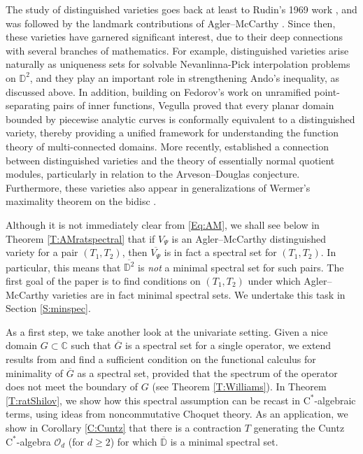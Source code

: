 \documentclass[10pt]{amsart}
\newcommand{\bC}{{\mathbb{C}}}
\newcommand{\bD}{{\mathbb{D}}}
\renewcommand{\O}{{\mathcal{O}}}
\newcommand{\rC}{\mathrm{C}}
\newcommand{\ol}{\overline}
\theoremstyle{definition}
\begin{document}
The study of distinguished varieties goes back at least to Rudin's 1969 work \cite{RudinTAMS}, and was followed by the landmark contributions of Agler--McCarthy \cite{AM2005}. Since then, these varieties have garnered significant interest, due to their deep connections with several branches of mathematics. For example, distinguished varieties arise naturally as uniqueness sets for solvable Nevanlinna-Pick interpolation problems on $\mathbb{D}^2$, and they play an important role in strengthening Ando's inequality, as discussed above. In addition, building on Fedorov's work on unramified point-separating pairs of inner functions, Vegulla \cite[Theorem 3.4.4]{VegullaThesis} proved that every planar domain bounded by piecewise analytic curves is conformally equivalent to a distinguished variety, thereby providing a unified framework for understanding the function theory of multi-connected domains. More recently, \cite{GWZ} established a connection between distinguished varieties and the theory of essentially normal quotient modules, particularly in relation to the Arveson--Douglas conjecture. Furthermore, these varieties also appear in generalizations of Wermer's maximality theorem on the bidisc \cite[Theorem 1.2]{SWInventiones}.


Although it is not immediately clear from \eqref{Eq:AM}, we shall see below in Theorem \ref{T:AMratspectral} that if $V_\Psi$ is an Agler--McCarthy distinguished variety for a pair $(T_1,T_2)$, then $\ol{V_\Psi}$  is in fact a spectral set for $(T_1,T_2)$.  In particular, this means that $\ol{\bD^2}$ is \emph{not} a minimal spectral set for such pairs.  The first goal of the paper is to find conditions on $(T_1,T_2)$ under which Agler--McCarthy varieties are in fact minimal spectral sets. We undertake this task in Section \ref{S:minspec}. 

As a first step, we take  another look at the univariate setting. Given a nice domain $G\subset \bC$ such that $\ol{G}$ is a spectral set for a single operator, we extend results from  \cite{williams1967} and find a sufficient condition on the functional calculus for minimality of $\ol{G}$ as a spectral set, provided that the spectrum of the operator does not meet the boundary of $G$ (see Theorem \ref{T:Williams}). In Theorem \ref{T:ratShilov}, we show how this spectral assumption can be recast in $\rC^*$-algebraic terms, using ideas from noncommutative Choquet theory. As an application, we show in Corollary \ref{C:Cuntz} that there is a contraction $T$ generating the Cuntz $\rC^*$-algebra $\O_d$ (for $d\geq 2$) for which $\ol{\bD}$ is a minimal spectral set. 
\end{document}
